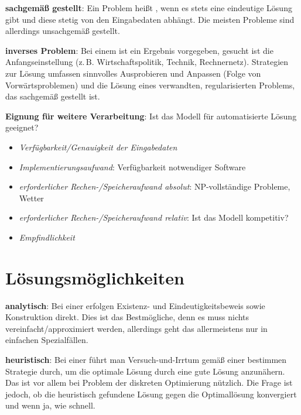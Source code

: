\textbf{sachgemäß gestellt}:
Ein Problem heißt , wenn es stets eine eindeutige Lösung gibt und
diese stetig von den Eingabedaten abhängt.
Die meisten Probleme sind allerdings unsachgemäß gestellt.

\textbf{inverses Problem}:
Bei einem  ist ein Ergebnis vorgegeben, gesucht ist die
Anfangseinstellung
(z.\,B. Wirtschaftspolitik, Technik, Rechnernetz).
Strategien zur Lösung umfassen sinnvolles Ausprobieren und Anpassen (Folge von Vorwärtsproblemen)
und die Lösung eines verwandten, regularisierten Problems, das sachgemäß gestellt ist.

\linie

\textbf{Eignung für weitere Verarbeitung}:
Ist das Modell für automatisierte Lösung geeignet?
\begin{itemize}
    \item
    \emph{Verfügbarkeit/Genauigkeit der Eingabedaten}

    \item
    \emph{Implementierungsaufwand}:
    Verfügbarkeit notwendiger Software

    \item
    \emph{erforderlicher Rechen-/Speicheraufwand absolut}:
    NP-vollständige Probleme, Wetter

    \item
    \emph{erforderlicher Rechen-/Speicheraufwand relativ}:
    Ist das Modell kompetitiv?

    \item
    \emph{Empfindlichkeit}
\end{itemize}

\section{%
    Lösungsmöglichkeiten%
}

\textbf{analytisch}:
Bei einer  erfolgen
Existenz- und Eindeutigkeitsbeweis sowie Konstruktion direkt.
Dies ist das Bestmögliche, denn es muss nichts vereinfacht/approximiert werden,
allerdings geht das allermeistens nur in einfachen Spezialfällen.

\textbf{heuristisch}:
Bei einer  führt man Versuch-und-Irrtum gemäß einer bestimmen
Strategie durch, um die optimale Lösung durch eine gute Lösung anzunähern.
Das ist vor allem bei Problem der diskreten Optimierung nützlich.
Die Frage ist jedoch, ob die heuristisch gefundene Lösung gegen die Optimallösung konvergiert
und wenn ja, wie schnell.

